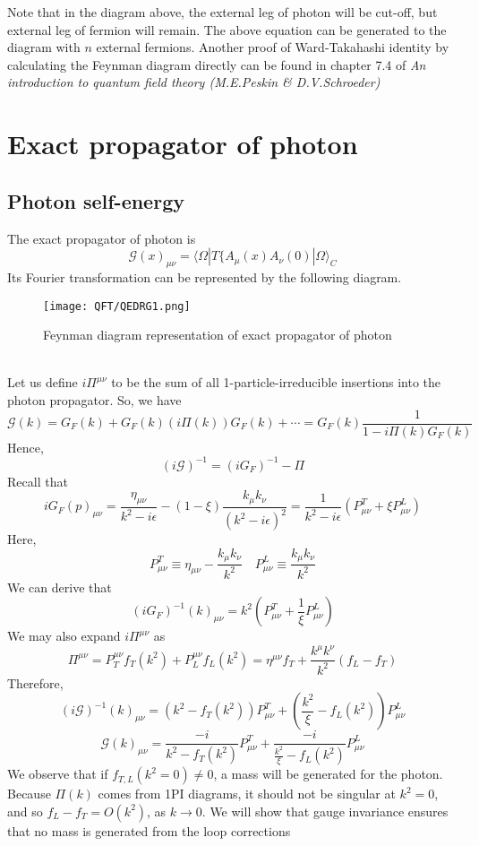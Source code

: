 Note that in the diagram above, the external leg of photon will be cut-off, but external leg of fermion will remain.
The above equation can be generated to the diagram with $n$ external fermions. 
Another proof of Ward-Takahashi identity by calculating the Feynman diagram directly can be found in chapter 7.4 of \emph{An introduction to quantum field theory (M.E.Peskin \& D.V.Schroeder)}

\section{Exact propagator of photon}
\subsection{Photon self-energy}
\noindent
The exact propagator of photon is
\[\mathcal{G}(x)_{\mu\nu} = \langle  \Omega | T \{ A_{\mu}(x)A_{\nu}(0)| \Omega \rangle_C\]
Its Fourier transformation can be represented by the following diagram. 
\begin{figure}[!h]
\centering
\texttt{[image: QFT/QEDRG1.png]}
\caption{Feynman diagram representation of exact propagator of photon}
\end{figure}\\
Let us define $i\Pi^{\mu\nu}$ to be the sum of all 1-particle-irreducible insertions into the photon propagator. So, we have
\[\mathcal{G}(k) = G_F(k) + G_F(k)(i\Pi(k))G_F(k) + \cdots = G_F(k) \frac{1}{1-i\Pi(k)G_F(k)}\]
Hence,
\[(i\mathcal{G})^{-1} = (iG_F)^{-1} - \Pi\]
Recall that
\[iG_F(p)_{\mu\nu}  = \frac{\eta_{\mu\nu}}{k^2-i\epsilon} - (1-\xi)\frac{k_{\mu}k_{\nu}}{(k^2-i\epsilon)^2} = \frac{1}{k^2-i\epsilon}(P^T_{\mu\nu} + \xi P^L_{\mu\nu})\]
Here, \[P^T_{\mu\nu} \equiv \eta_{\mu\nu} - \frac{k_{\mu}k_{\nu}}{k^2} \quad  P^L_{\mu\nu} \equiv \frac{k_{\mu}k_{\nu}}{k^2}\]
We can derive that
\[(iG_F)^{-1}(k)_{\mu\nu} = k^2 (P^T_{\mu\nu} + \frac{1}{\xi} P^L_{\mu\nu})\]
We may also expand $i\Pi^{\mu\nu}$ as
\[\Pi^{\mu\nu} = P_T^{\mu\nu}f_T(k^2) +  P_L^{\mu\nu}f_L(k^2) = \eta^{\mu\nu}f_T + \frac{k^{\mu}k^{\nu}}{k^2}(f_L-f_T)\]
Therefore,
\[(i\mathcal{G})^{-1}(k)_{\mu\nu} = (k^2-f_T(k^2))P^T_{\mu\nu} + (\frac{k^2}{\xi}-f_L(k^2)) P^L_{\mu\nu}\]
\[\mathcal{G}(k)_{\mu\nu} = \frac{-i}{k^2-f_T(k^2)}P^T_{\mu\nu} + \frac{-i}{\frac{k^2}{\xi}-f_L(k^2)} P^L_{\mu\nu}\]
We observe that if $f_{T,L}(k^2 = 0) \neq 0$, a mass will be generated for the photon. Because $\Pi(k)$ comes from 1PI diagrams, it should not be singular at $k^2 =0 $, and so $f_L - f_T = O(k^2)$, as $k \to 0$. We will show that gauge invariance ensures that no mass is generated from the loop corrections

